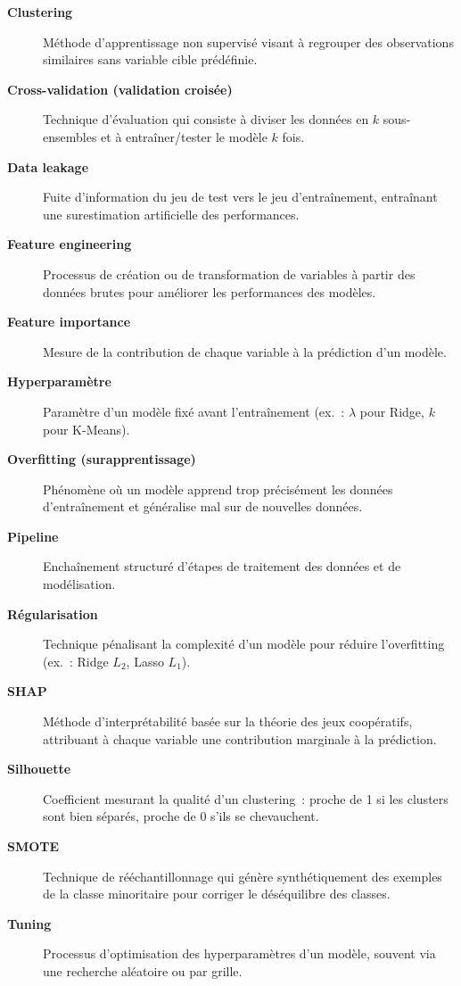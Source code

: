 
\begin{description}
  \item[\textbf{Clustering}] Méthode d'apprentissage non supervisé visant à regrouper des observations similaires sans variable cible prédéfinie.

  \item[\textbf{Cross-validation (validation croisée)}] Technique d'évaluation qui consiste à diviser les données en $k$ sous-ensembles et à entraîner/tester le modèle $k$ fois.

  \item[\textbf{Data leakage}] Fuite d'information du jeu de test vers le jeu d'entraînement, entraînant une surestimation artificielle des performances.

  \item[\textbf{Feature engineering}] Processus de création ou de transformation de variables à partir des données brutes pour améliorer les performances des modèles.

  \item[\textbf{Feature importance}] Mesure de la contribution de chaque variable à la prédiction d'un modèle.

  \item[\textbf{Hyperparamètre}] Paramètre d'un modèle fixé avant l'entraînement (ex.~: $\lambda$ pour Ridge, $k$ pour K-Means).

  \item[\textbf{Overfitting (surapprentissage)}] Phénomène où un modèle apprend trop précisément les données d'entraînement et généralise mal sur de nouvelles données.

  \item[\textbf{Pipeline}] Enchaînement structuré d'étapes de traitement des données et de modélisation.

  \item[\textbf{Régularisation}] Technique pénalisant la complexité d'un modèle pour réduire l'overfitting (ex.~: Ridge $L_2$, Lasso $L_1$).

  \item[\textbf{SHAP}] Méthode d'interprétabilité basée sur la théorie des jeux coopératifs, attribuant à chaque variable une contribution marginale à la prédiction.

  \item[\textbf{Silhouette}] Coefficient mesurant la qualité d'un clustering~: proche de 1 si les clusters sont bien séparés, proche de 0 s'ils se chevauchent.

  \item[\textbf{SMOTE}] Technique de rééchantillonnage qui génère synthétiquement des exemples de la classe minoritaire pour corriger le déséquilibre des classes.

  \item[\textbf{Tuning}] Processus d'optimisation des hyperparamètres d'un modèle, souvent via une recherche aléatoire ou par grille.
\end{description}

\newpage
